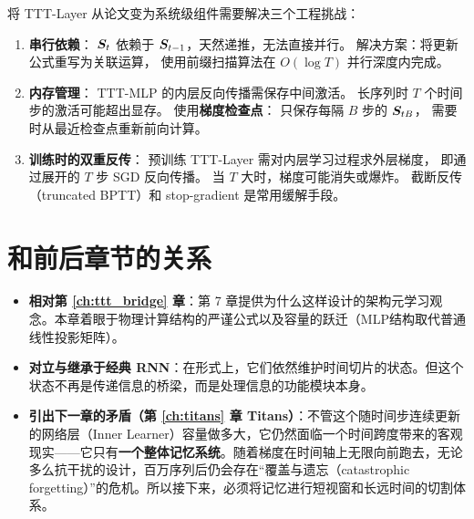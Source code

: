 将 TTT-Layer 从论文变为系统级组件需要解决三个工程挑战：

\begin{enumerate}
  \item \textbf{串行依赖}：
    $\boldsymbol{S}_t$ 依赖于 $\boldsymbol{S}_{t-1}$，天然递推，无法直接并行。
    解决方案：将更新公式重写为关联运算，
    使用前缀扫描算法在 $O(\log T)$ 并行深度内完成。

  \item \textbf{内存管理}：
    TTT-MLP 的内层反向传播需保存中间激活。
    长序列时 $T$ 个时间步的激活可能超出显存。
    使用\textbf{梯度检查点}：
    只保存每隔 $B$ 步的 $\boldsymbol{S}_{tB}$，
    需要时从最近检查点重新前向计算。

  \item \textbf{训练时的双重反传}：
    预训练 TTT-Layer 需对内层学习过程求外层梯度，
    即通过展开的 $T$ 步 SGD 反向传播。
    当 $T$ 大时，梯度可能消失或爆炸。
    截断反传（truncated BPTT）和
    stop-gradient 是常用缓解手段。
\end{enumerate}

\section{和前后章节的关系}
\label{sec:ttt_layers_bridges}

\begin{itemize}
    \item \textbf{相对第 \ref{ch:ttt_bridge} 章}：第 7 章提供为什么这样设计的架构元学习观念。本章着眼于物理计算结构的严谨公式以及容量的跃迁（MLP结构取代普通线性投影矩阵）。
    \item \textbf{对立与继承于经典 RNN}：在形式上，它们依然维护时间切片的状态。但这个状态不再是传递信息的桥梁，而是处理信息的功能模块本身。
    \item \textbf{引出下一章的矛盾（第 \ref{ch:titans} 章 Titans）}：不管这个随时间步连续更新的网络层（Inner Learner）容量做多大，它仍然面临一个时间跨度带来的客观现实——它只有\textbf{一个整体记忆系统}。随着梯度在时间轴上无限向前跑去，无论多么抗干扰的设计，百万序列后仍会存在“覆盖与遗忘（catastrophic forgetting）”的危机。所以接下来，必须将记忆进行短视窗和长远时间的切割体系。
\end{itemize}

